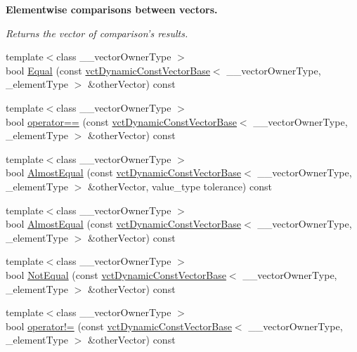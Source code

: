 \begin{Indent}{\bf Elementwise comparisons between vectors.}\par
{\em Returns the vector of comparison's results. }\begin{DoxyCompactItemize}
\item 
{\footnotesize template$<$class \-\_\-\-\_\-vector\-Owner\-Type $>$ }\\bool \hyperlink{classvct_dynamic_const_vector_base_acc28a646977b6f3f5e5c74c31fb59658}{Equal} (const \hyperlink{classvct_dynamic_const_vector_base}{vct\-Dynamic\-Const\-Vector\-Base}$<$ \-\_\-\-\_\-vector\-Owner\-Type, \-\_\-element\-Type $>$ \&other\-Vector) const 
\item 
{\footnotesize template$<$class \-\_\-\-\_\-vector\-Owner\-Type $>$ }\\bool \hyperlink{classvct_dynamic_const_vector_base_a7213f01662571a4c678f8dd7fff41283}{operator==} (const \hyperlink{classvct_dynamic_const_vector_base}{vct\-Dynamic\-Const\-Vector\-Base}$<$ \-\_\-\-\_\-vector\-Owner\-Type, \-\_\-element\-Type $>$ \&other\-Vector) const 
\item 
{\footnotesize template$<$class \-\_\-\-\_\-vector\-Owner\-Type $>$ }\\bool \hyperlink{classvct_dynamic_const_vector_base_aa066902b9db1f5adf7ed041255d1966c}{Almost\-Equal} (const \hyperlink{classvct_dynamic_const_vector_base}{vct\-Dynamic\-Const\-Vector\-Base}$<$ \-\_\-\-\_\-vector\-Owner\-Type, \-\_\-element\-Type $>$ \&other\-Vector, value\-\_\-type tolerance) const 
\item 
{\footnotesize template$<$class \-\_\-\-\_\-vector\-Owner\-Type $>$ }\\bool \hyperlink{classvct_dynamic_const_vector_base_a31e8da9af751fb8677d4113f1c66b0d8}{Almost\-Equal} (const \hyperlink{classvct_dynamic_const_vector_base}{vct\-Dynamic\-Const\-Vector\-Base}$<$ \-\_\-\-\_\-vector\-Owner\-Type, \-\_\-element\-Type $>$ \&other\-Vector) const 
\item 
{\footnotesize template$<$class \-\_\-\-\_\-vector\-Owner\-Type $>$ }\\bool \hyperlink{classvct_dynamic_const_vector_base_a813a9d4d294740d8b238533cd5b69e77}{Not\-Equal} (const \hyperlink{classvct_dynamic_const_vector_base}{vct\-Dynamic\-Const\-Vector\-Base}$<$ \-\_\-\-\_\-vector\-Owner\-Type, \-\_\-element\-Type $>$ \&other\-Vector) const 
\item 
{\footnotesize template$<$class \-\_\-\-\_\-vector\-Owner\-Type $>$ }\\bool \hyperlink{classvct_dynamic_const_vector_base_a9c1a544a366dd2b4b33480f77b9f1648}{operator!=} (const \hyperlink{classvct_dynamic_const_vector_base}{vct\-Dynamic\-Const\-Vector\-Base}$<$ \-\_\-\-\_\-vector\-Owner\-Type, \-\_\-element\-Type $>$ \&other\-Vector) const 

\end{DoxyCompactItemize}
\end{Indent}
